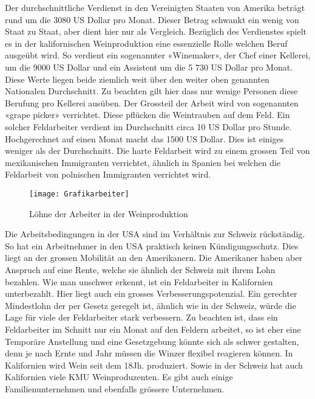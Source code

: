 Der durchschnittliche Verdienst in den Vereinigten Staaten von Amerika beträgt rund um die 3080 US Dollar pro Monat. \cite{_assistant} Dieser Betrag schwankt ein wenig von Staat zu Staat, aber dient hier nur als Vergleich. Bezüglich des Verdienstes spielt es in der kalifornischen Weinproduktion eine essenzielle Rolle welchen Beruf ausgeübt wird. So verdient ein sogenannter «Winemaker», der Chef einer Kellerei, um die 9000 US
Dollar und ein Assistent um die 5 730 US Dollar pro Monat. Diese Werte liegen beide ziemlich weit über den weiter oben genannten Nationalen Durchschnitt. Zu beachten gilt hier dass nur wenige Personen diese Berufung pro Kellerei ausüben. Der Grossteil der Arbeit
wird von sogenannten «grape picker» verrichtet. Diese pflücken die Weintrauben auf dem Feld. Ein solcher Feldarbeiter verdient im Durchschnitt circa 10 US Dollar pro Stunde.
\cite{_farm} Hochgerechnet auf einen Monat macht das 1500 US Dollar. Dies ist einiges weniger als der Durchschnitt. Die harte Feldarbeit wird zu einem grossen Teil von mexikanischen Immigranten verrichtet, ähnlich in Spanien bei welchen die Feldarbeit von polnischen Immigranten verrichtet wird.
\begin{figure}[H]
	\centering
	\texttt{[image: Grafikarbeiter]}
	\caption{Löhne der Arbeiter in der Weinproduktion}
\end{figure}
Die Arbeitsbedingungen in der USA sind im Verhältnis zur Schweiz rückständig. So hat ein
Arbeitnehmer in den USA praktisch keinen Kündigungsschutz. Dies liegt an der grossen Mobilität an
den Amerikanern. Die Amerikaner haben aber Anspruch auf eine Rente, welche sie ähnlich der Schweiz
mit ihrem Lohn bezahlen. \cite{_arbeitszeiten} Wie man unschwer erkennt, ist ein Feldarbeiter in
Kalifornien unterbezahlt. Hier liegt auch ein grosses Verbesserungspotenzial. Ein gerechter
Mindestlohn der per Gesetz geregelt ist, ähnlich wie in der Schweiz, würde die Lage für viele der
Feldarbeiter stark verbessern. Zu beachten ist, dass ein Feldarbeiter im Schnitt nur ein Monat auf den Feldern arbeitet, so ist eher eine Temporäre Anstellung und eine Gesetzgebung könnte sich als schwer gestalten, denn je nach Ernte und Jahr  müssen die Winzer flexibel reagieren können. In Kalifornien wird Wein seit dem 18Jh. produziert. Sowie in der Schweiz hat auch Kalifornien viele KMU Weinproduzenten. Es gibt auch einige Familienunternehmen und ebenfalls grössere Unternehmen.




